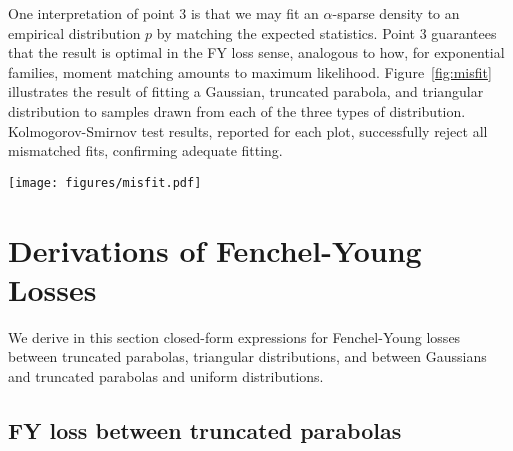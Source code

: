 \documentclass{article}
\begin{document}
{One interpretation of point 3 is that we may fit an $\alpha$-sparse
density to an empirical distribution $p$ by matching the expected statistics.
Point 3 guarantees that the result is optimal in the FY loss sense, analogous to
how, for exponential families, moment matching amounts to maximum likelihood.
Figure~\ref{fig:misfit} illustrates the result of fitting a Gaussian, truncated
parabola, and triangular distribution to samples drawn from each of the three
types of distribution. Kolmogorov-Smirnov test results, reported for each plot,
successfully reject all mismatched fits, confirming adequate fitting.

\begin{figure*}[t]\centering\texttt{[image: figures/misfit.pdf]}
\caption{\label{fig:misfit}Fitting a Gaussian, truncated parabola, and triangular distribution
(rows, $\downarrow$) to 10,000 samples from a Gaussian, truncated parabola, and
triangular (columns, $\rightarrow$). For each fit, we report the
Kolmogorov-Smirnov distance $D$ and corresponding $p$-value $p$.}
\end{figure*}


\section{Derivations of Fenchel-Young Losses}\label{sec:fy_example_derivations}

We derive in this section closed-form expressions for Fenchel-Young losses between truncated parabolas, triangular distributions, and between Gaussians and truncated parabolas and uniform distributions.

\subsection{FY loss between truncated parabolas}

}
\end{document}
